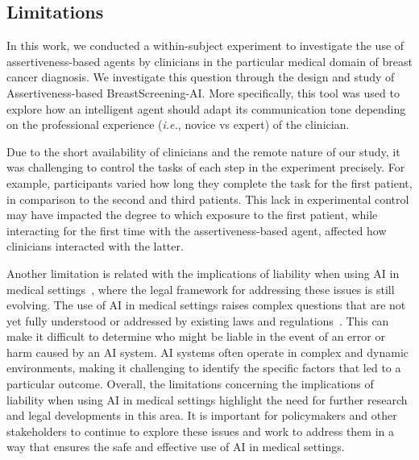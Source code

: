 

\subsection{Limitations}
\label{sec:chap006007002}

In this work, we conducted a within-subject experiment to investigate the use of assertiveness-based agents by clinicians in the particular medical domain of breast cancer diagnosis.
We investigate this question through the design and study of Assertiveness-based BreastScreening-AI.
More specifically, this tool was used to explore how an intelligent agent should adapt its communication tone depending on the professional experience ({\it i.e.}, novice vs expert) of the clinician.

Due to the short availability of clinicians and the remote nature of our study, it was challenging to control the tasks of each step in the experiment precisely.
For example, participants varied how long they complete the task for the first patient, in comparison to the second and third patients.
This lack in experimental control may have impacted the degree to which exposure to the first patient, while interacting for the first time with the assertiveness-based agent, affected how clinicians interacted with the latter.

Another limitation is related with the implications of liability when using AI in medical settings~\cite{10.1145/3555157}, where the legal framework for addressing these issues is still evolving.
The use of AI in medical settings raises complex questions that are not yet fully understood or addressed by existing laws and regulations~\cite{10.1145/3411764.3445432}.
This can make it difficult to determine who might be liable in the event of an error or harm caused by an AI system.
AI systems often operate in complex and dynamic environments, making it challenging to identify the specific factors that led to a particular outcome.
Overall, the limitations concerning the implications of liability when using AI in medical settings highlight the need for further research and legal developments in this area.
It is important for policymakers and other stakeholders to continue to explore these issues and work to address them in a way that ensures the safe and effective use of AI in medical settings.

